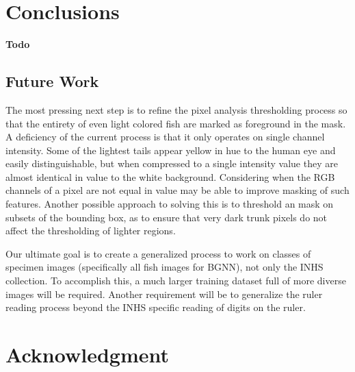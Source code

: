 \documentclass[conference]{IEEEtran}
\begin{document}


\section{Conclusions}
\textbf{Todo}
\subsection{Future Work}
The most pressing next step is to refine the pixel analysis thresholding process so that the entirety of even light colored fish are marked as foreground in the mask. A deficiency of the current process is that it only operates on single channel intensity. Some of the lightest tails appear yellow in hue to the human eye and easily distinguishable, but when compressed to a single intensity value they are almost identical in value to the white background. Considering when the RGB channels of a pixel are not equal in value may be able to improve masking of such features. Another possible approach to solving this is to threshold an mask on subsets of the bounding box, as to ensure that very dark trunk pixels do not affect the thresholding of lighter regions.

Our ultimate goal is to create a generalized process to work on classes of specimen images (specifically all fish images for BGNN), not only the INHS collection. To accomplish this, a much larger training dataset full of more diverse images will be required. Another requirement will be to generalize the ruler reading process beyond the INHS specific reading of digits on the ruler.

\section*{Acknowledgment}



\end{document}
